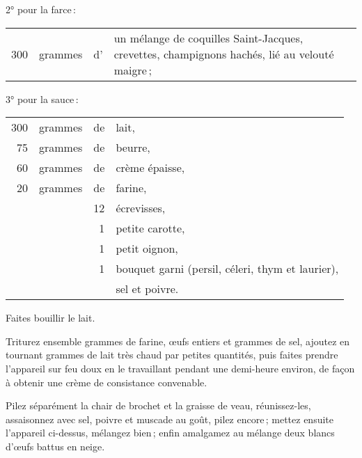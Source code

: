 2° pour la farce :

\footnotesize
\begin{longtable}{rrrp{16em}}
    300 & grammes & d' & un mélange de coquilles Saint-Jacques, crevettes, champignons
                    hachés, lié au velouté maigre ;                                                       \\
\end{longtable}
\normalsize

3° pour la sauce :

\footnotesize
\begin{longtable}{rrrp{16em}}
    300 & grammes & de & lait,                                                                            \\
     75 & grammes & de & beurre,                                                                          \\
     60 & grammes & de & crème épaisse,                                                                   \\
     20 & grammes & de & farine,                                                                          \\
        &         & 12 & écrevisses,                                                                      \\
        &         &  1 & petite carotte,                                                                  \\
        &         &  1 & petit oignon,                                                                    \\
        &         &  1 & bouquet garni (persil, céleri, thym et laurier),                                 \\
        &         &    & sel et poivre.                                                                   \\
\end{longtable}
\normalsize

Faites bouillir le lait.

Triturez ensemble {\mmm} grammes de farine, {\mmm} œufs entiers et
{\mmm} grammes de sel, ajoutez en tournant {\mmm} grammes de lait
très chaud par petites quantités, puis faites prendre l'appareil sur feu doux
en le travaillant pendant une demi-heure environ, de façon à obtenir une crème
de consistance convenable.

Pilez séparément la chair de brochet et la graisse de veau, réunissez-les,
assaisonnez avec sel, poivre et muscade au goût, pilez encore ; mettez ensuite
l'appareil ci-dessus, mélangez bien ; enfin amalgamez au mélange deux blancs
d'œufs battus en neige.

